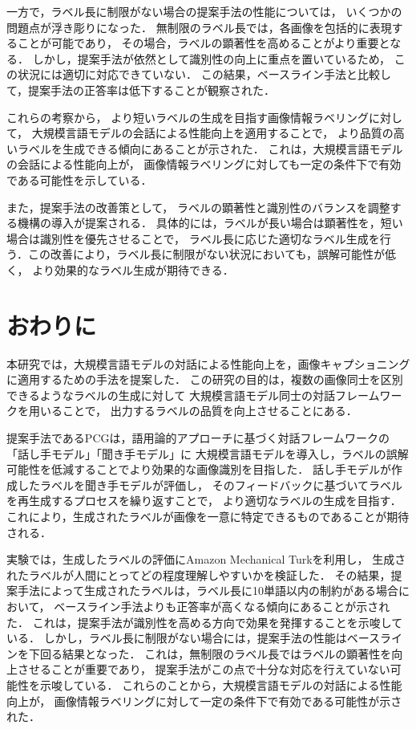 \documentclass[a4paper,11pt]{jreport}
\begin{document}
一方で，ラベル長に制限がない場合の提案手法の性能については，
いくつかの問題点が浮き彫りになった．
無制限のラベル長では，各画像を包括的に表現することが可能であり，
その場合，ラベルの顕著性を高めることがより重要となる．
しかし，提案手法が依然として識別性の向上に重点を置いているため，
この状況には適切に対応できていない．
この結果，ベースライン手法と比較して，提案手法の正答率は低下することが観察された．

これらの考察から，
より短いラベルの生成を目指す画像情報ラベリングに対して，
大規模言語モデルの会話による性能向上を適用することで，
より品質の高いラベルを生成できる傾向にあることが示された．
これは，大規模言語モデルの会話による性能向上が，
画像情報ラベリングに対しても一定の条件下で有効である可能性を示している．

また，提案手法の改善策として，
ラベルの顕著性と識別性のバランスを調整する機構の導入が提案される．
具体的には，ラベルが長い場合は顕著性を，短い場合は識別性を優先させることで，
ラベル長に応じた適切なラベル生成を行う．この改善により，ラベル長に制限がない状況においても，誤解可能性が低く，
より効果的なラベル生成が期待できる．

\chapter{おわりに}

本研究では，大規模言語モデルの対話による性能向上を，画像キャプショニングに適用するための手法を提案した．
この研究の目的は，複数の画像同士を区別できるようなラベルの生成に対して
大規模言語モデル同士の対話フレームワークを用いることで，
出力するラベルの品質を向上させることにある．

提案手法であるPCGは，語用論的アプローチに基づく対話フレームワークの「話し手モデル」「聞き手モデル」に
大規模言語モデルを導入し，ラベルの誤解可能性を低減することでより効果的な画像識別を目指した．
話し手モデルが作成したラベルを聞き手モデルが評価し，
そのフィードバックに基づいてラベルを再生成するプロセスを繰り返すことで，
より適切なラベルの生成を目指す．
これにより，生成されたラベルが画像を一意に特定できるものであることが期待される．

実験では，生成したラベルの評価にAmazon Mechanical Turkを利用し，
生成されたラベルが人間にとってどの程度理解しやすいかを検証した．
その結果，提案手法によって生成されたラベルは，ラベル長に10単語以内の制約がある場合において，
ベースライン手法よりも正答率が高くなる傾向にあることが示された．
これは，提案手法が識別性を高める方向で効果を発揮することを示唆している．
しかし，ラベル長に制限がない場合には，提案手法の性能はベースラインを下回る結果となった．
これは，無制限のラベル長ではラベルの顕著性を向上させることが重要であり，
提案手法がこの点で十分な対応を行えていない可能性を示唆している．
これらのことから，大規模言語モデルの対話による性能向上が，
画像情報ラベリングに対して一定の条件下で有効である可能性が示された．
\end{document}
